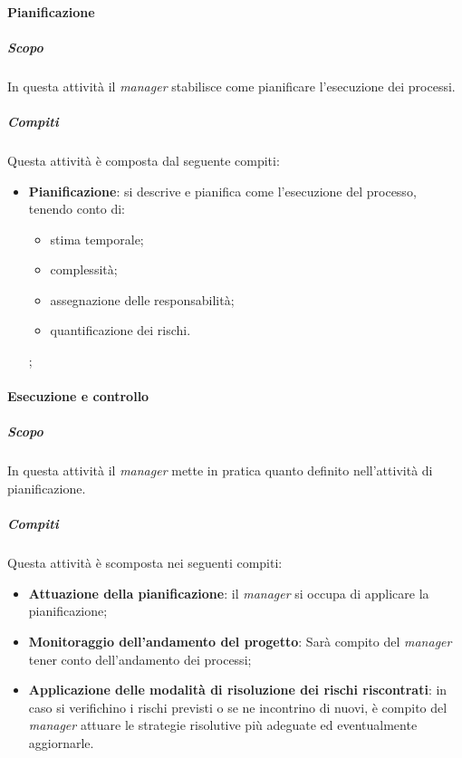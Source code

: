 \paragraph{Pianificazione}
\label{par:pianificazione}
\subparagraph{Scopo}
\label{par:pianificazione:scopo}
In questa attività il \emph{manager} stabilisce come pianificare l'esecuzione dei processi.\\
\subparagraph{Compiti}
\label{par:pianificazione:compiti}
Questa attività è composta dal seguente compiti:
\begin{itemize}
    \item \textbf{Pianificazione}: si descrive e pianifica come l'esecuzione del processo, tenendo conto di:
    \begin{itemize}
        \item stima temporale;
        \item complessità;
        \item assegnazione delle responsabilità;
        \item quantificazione dei rischi.
    \end{itemize};
\end{itemize}

\paragraph{Esecuzione e controllo}
\label{par:esecuzione_e_controllo}
\subparagraph{Scopo}
\label{par:esecuzione_e_controllo:scopo}
In questa attività il \emph{manager} mette in pratica quanto definito nell'attività di pianificazione.
\subparagraph{Compiti}
\label{par:esecuzione_e_controllo:compiti}
Questa attività è scomposta nei seguenti compiti:
\begin{itemize}
    \item \textbf{Attuazione della pianificazione}: il \emph{manager} si occupa di applicare la pianificazione;
    \item \textbf{Monitoraggio dell'andamento del progetto}: Sarà compito del \emph{manager} tener conto dell'andamento dei processi;
    \item \textbf{Applicazione delle modalità di risoluzione dei rischi riscontrati}: in caso si verifichino i rischi previsti o se ne incontrino di nuovi, è compito del \emph{manager} attuare le strategie risolutive più adeguate ed eventualmente aggiornarle.
\end{itemize}

